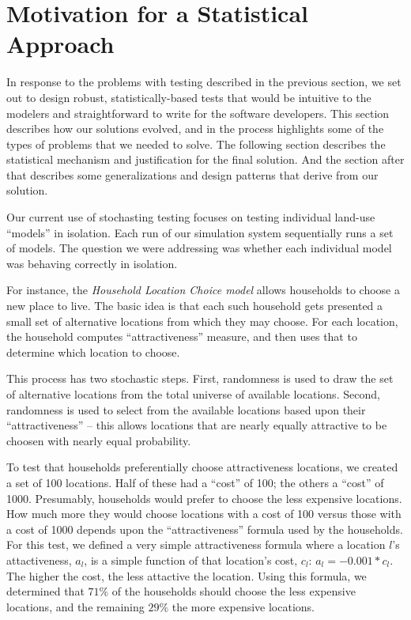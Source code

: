 


\section{Motivation for a Statistical Approach}

In response to the problems with testing described in the previous section, we 
set out to design robust, statistically-based tests that would be intuitive to 
the modelers and straightforward to write for the software developers.  This 
section describes how our solutions evolved, and in the process highlights some 
of the types of problems that we needed to solve.  The following section
describes the statistical mechanism and justification for the final solution. 
And the section after that describes some generalizations and design patterns
that derive from our solution.

Our current use of stochasting testing focuses on testing individual land-use ``models''
in isolation.  Each run of our simulation system sequentially runs a set of
models.  The question we were addressing was whether each individual model was
behaving correctly in isolation.  

For instance, the \emph{Household Location Choice model} allows households to choose a 
new place to live.  The basic idea is that each such household gets presented a 
small set of alternative locations from which they may choose.  For each 
location, the household computes ``attractiveness'' measure, and then uses that 
to determine which location to choose.

This process has two stochastic steps.  First, randomness is used to draw the 
set of alternative locations from the total universe of available locations. 
Second, randomness is used to select from the available locations based upon 
their ``attractiveness'' -- this allows locations that are nearly equally 
attractive to be choosen with nearly equal probability.

To test that households preferentially choose attractiveness locations, we 
created a set of 100 locations.  Half of these had a ``cost'' of 100; the others 
a ``cost'' of 1000.  Presumably, households would prefer to choose the less 
expensive locations.  How much more they would choose locations with a cost of 
100 versus those with a cost of 1000 depends upon the ``attractiveness'' 
formula used by the households.  For this test, we defined a very simple 
attractiveness formula where a location $l$'s attactiveness, $a_{l}$, is a 
simple function of that location's cost, $c_{l}$: $a_{l} = -0.001 * c_{l}$.  
The higher the cost, the less attactive the location.  Using this formula, we 
determined that $71\%$ of the households should choose the less expensive 
locations, and the remaining $29\%$ the more expensive locations.

